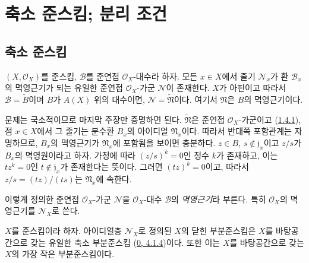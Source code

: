 \section{축소 준스킴; 분리 조건}
\label{section:I.5-ko}

\subsection{축소 준스킴}
\label{subsection:I.5.1-ko}

\begin{proposition}[5.1.1]
\label{I.5.1.1-ko}
$(X,\mathscr{O}_X)$를 준스킴, $\mathscr{B}$를 준연접
$\mathscr{O}_X$-대수라 하자. 모든 $x\in X$에서 줄기 $\mathscr{N}_x$가
환 $\mathscr{B}_x$의 멱영근기가 되는 유일한 준연접
$\mathscr{O}_X$-가군 $\mathscr{N}$이 존재한다. $X$가 아핀이고 따라서
$\mathscr{B}=\widetilde{B}$이며 $B$가 $A(X)$ 위의 대수이면,
$\mathscr{N}=\widetilde{\mathfrak{N}}$이다. 여기서 $\mathfrak{N}$은
$B$의 멱영근기이다.
\end{proposition}

문제는 국소적이므로 마지막 주장만 증명하면 된다.
$\widetilde{\mathfrak{N}}$은 준연접 $\mathscr{O}_X$-가군이고
(\hyperref[I.1.4.1-ko]{1.4.1}), 점 $x\in X$에서 그 줄기는 분수환
$B_x$의 아이디얼 $\mathfrak{N}_x$이다. 따라서 반대쪽 포함관계는
자명하므로, $B_x$의 멱영근기가 $\mathfrak{N}_x$에 포함됨을 보이면
충분하다. $z\in B$, $s\notin\mathfrak{j}_x$이고 $z/s$가 $B_x$의
멱영원이라고 하자. 가정에 따라 $(z/s)^k=0$인 정수 $k$가 존재하고,
이는 $tz^k=0$인 $t\notin\mathfrak{j}_x$가 존재한다는 뜻이다. 그러면
$(tz)^k=0$이고, 따라서 $z/s=(tz)/(ts)$는 $\mathfrak{N}_x$에 속한다.

이렇게 정의한 준연접 $\mathscr{O}_X$-가군 $\mathscr{N}$을
$\mathscr{O}_X$-대수 $\mathscr{B}$의 \emph{멱영근기}라 부른다. 특히
$\mathscr{O}_X$의 멱영근기를 $\mathscr{N}_X$로 쓴다.

\begin{corollary}[5.1.2]
\label{I.5.1.2-ko}
$X$를 준스킴이라 하자. 아이디얼층 $\mathscr{N}_X$로 정의된 $X$의
닫힌 부분준스킴은 $X$를 바탕공간으로 갖는 유일한 축소 부분준스킴
(\hyperref[0.4.1.4-ko]{0, 4.1.4})이다. 또한 이는 $X$를 바탕공간으로
갖는 $X$의 가장 작은 부분준스킴이다.
\end{corollary}

